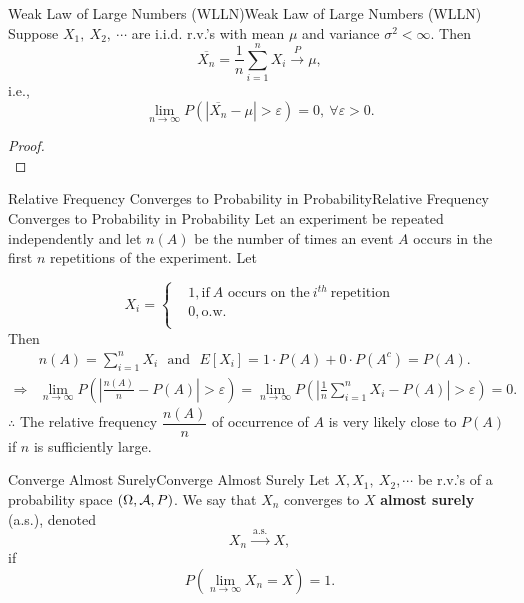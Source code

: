\documentclass{elegantbook}
\begin{document}
\begin{theorem}{Weak Law of Large Numbers (WLLN)}{Weak Law of Large Numbers (WLLN)}
Suppose \(X_{1},\ X_{2},\ \cdots\) are i.i.d. r.v.'s with mean \(\mu\) and variance \(\sigma^{2} < \infty\). Then
\[\overline{X_{n}} = \frac{1}{n}\sum_{i = 1}^{n}X_{i}\xrightarrow{\ P\ }\mu,\]
i.e.,
\[ \lim_{n \rightarrow \infty}{P\left( \left| \overline{X_{n}} - \mu \right| > \varepsilon \right)} = 0,\ \forall\varepsilon > 0.\]
\end{theorem}

\begin{proof}
\\[4cm]\vspace{0.01cm}
\end{proof}

\begin{remark}{Relative Frequency Converges to Probability in Probability}{Relative Frequency Converges to Probability in Probability}
Let an experiment be repeated independently and let \(n(A)\) be the
number of times an event \(A\) occurs in the first \(n\) repetitions of
the experiment. Let

\[X_{i} = \left\{ \begin{aligned}
&1,\mathrm{\text{if}}\ A \mathrm{\text{\ occurs\ on\ the}}\ i^{th}\ \mathrm{\text{repetition}} \\
&0, \mathrm{\text{o.w.}} \\
\end{aligned} \right.\]
Then
\[\begin{aligned}
 &n(A) = \sum_{i = 1}^{n}X_{i}\text{\ \ }\mathrm{\text{and}}\text{\ \ }E[X_{i} ]= 1 \cdot P(A) + 0 \cdot P(A^{c}) = P(A).\\
\Rightarrow& \lim_{n \rightarrow \infty}{P\left( \left| \frac{n(A)}{n} - P(A) \right| > \varepsilon \right)} = \lim_{n \rightarrow \infty}{P\left( \left| \frac{1}{n}\sum_{i = 1}^{n}X_{i} - P(A) \right| > \varepsilon \right)} = 0.
\end{aligned}\]
\(\therefore\) The relative frequency $\dfrac{n(A)}{n}$ of occurrence of $A$ is very likely close to $P(A)$ if $n$ is suf\/f\/iciently large.
\end{remark}

\begin{definition}{Converge Almost Surely}{Converge Almost Surely}
Let \(X,X_{1},\ X_{2},\cdots\) be r.v.'s of a probability space $(\Omega,\mathcal{A}, P)$. We say that \(X_{n}\) converges to \(X\) \textbf{almost surely} (a.s.),
denoted
\[X_{n}\xrightarrow{\ \text{a.s.}\ }X,\]
if \[P\left( \lim_{n \rightarrow \infty}X_{n} = X \right) = 1.\]
\end{definition}
\end{document}
